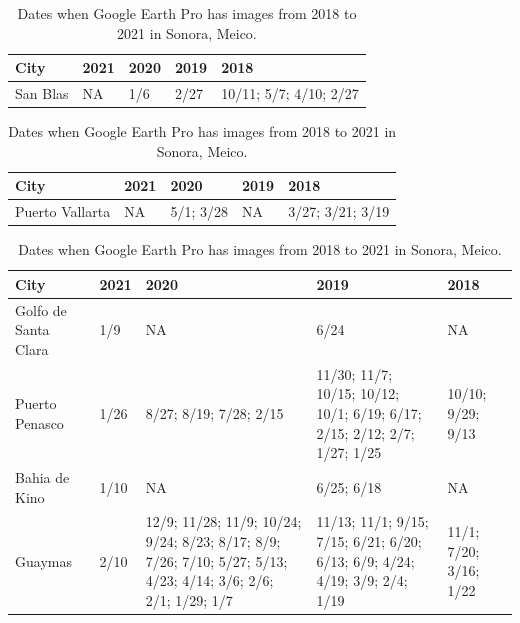 \begin{table}[p]
\centering
\begin{tabular}{ p{2.7cm} | p{2cm} | p{3cm} | p{3cm} | p{2cm} }
\toprule
City & 2021 & 2020 & 2019 & 2018 \\
\midrule
San Blas & NA & 1/6 & 2/27 & 10/11; 5/7; 4/10; 2/27\\
\bottomrule
\end{tabular}
\caption{Dates when Google Earth Pro has images from 2018 to 2021 in Nayarit, Meico.}
\label{table:Nayarit_dates}



\begin{tabular}{ p{2.7cm} | p{2cm} | p{3cm} | p{3cm} | p{2cm} }
\toprule
City & 2021 & 2020 & 2019 & 2018 \\
\midrule
Puerto Vallarta & NA & 5/1; 3/28 & NA & 3/27; 3/21; 3/19\\
\bottomrule
\end{tabular}
\caption{Dates when Google Earth Pro has images from 2018 to 2021 in Jalisco, Meico.}
\label{table:Jalisco_dates}



\begin{tabular}{ p{2.7cm} | p{2cm} | p{3cm} | p{3cm} | p{2cm} }
\toprule
City & 2021 & 2020 & 2019 & 2018 \\
\midrule
Golfo de Santa Clara & 1/9 & NA & 6/24 & NA\\
\midrule
Puerto Penasco & 1/26 & 8/27; 8/19; 7/28; 2/15 & 11/30; 11/7; 10/15; 10/12; 10/1; 6/19; 6/17; 2/15; 2/12; 2/7; 1/27; 1/25 & 10/10; 9/29; 9/13\\
\midrule
Bahia de Kino & 1/10 & NA & 6/25; 6/18 & NA\\
\midrule
Guaymas & 2/10 & 12/9; 11/28; 11/9; 10/24; 9/24; 8/23; 8/17; 8/9; 7/26; 7/10; 5/27; 5/13; 4/23; 4/14; 3/6; 2/6; 2/1; 1/29; 1/7 & 11/13; 11/1; 9/15; 7/15; 6/21; 6/20; 6/13; 6/9; 4/24; 4/19; 3/9; 2/4; 1/19 & 11/1; 7/20; 3/16; 1/22\\
\bottomrule
\end{tabular}
\caption{Dates when Google Earth Pro has images from 2018 to 2021 in Sonora, Meico.}
\label{table:Sonora_dates}
\end{table}



